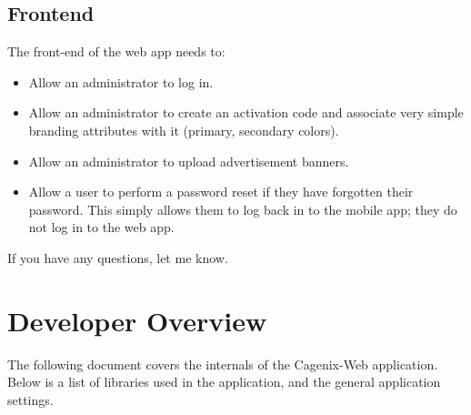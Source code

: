 \documentclass[letterpaper,10pt,english]{sphinxmanual}
\begin{document}
\section{Frontend}
\label{dev-bid:frontend}
The front-end of the web app needs to:
\begin{itemize}
\item {} 
Allow an administrator to log in.

\item {} 
Allow an administrator to create an activation code and associate very simple branding attributes with it (primary, secondary colors).

\item {} 
Allow an administrator to upload advertisement banners.

\item {} 
Allow a user to perform a password reset if they have forgotten their password. This simply allows them to log back in to the mobile app; they do not log in to the web app.

\end{itemize}

If you have any questions, let me know.


\chapter{Developer Overview}
\label{dev-overview:developer-overview}\label{dev-overview::doc}
The following document covers the internals of the Cagenix-Web
application.  Below is a list of libraries used in the application,
and the general application settings.
\end{document}
